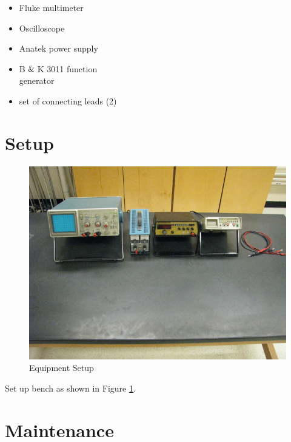 \begin{minipage}[t]{0.55\textwidth}
\begin{itemize}[noitemsep]
\item Fluke multimeter
\item Oscilloscope
\item Anatek power supply
\end{itemize}
\end{minipage}
\begin{minipage}[t]{0.45\textwidth}
\begin{itemize}[noitemsep]
\item B$\And$K 3011 function \\generator
\item set of connecting leads (2)
\end{itemize}
\end{minipage}


\section{Setup}
\begin{figure}
\includegraphics{AC-Measurements-Setup.jpg}
\caption{Equipment Setup}
\label{pic:ACsetup}
\end{figure}

Set up bench as shown in Figure \ref{pic:ACsetup}.

\section{Maintenance}

